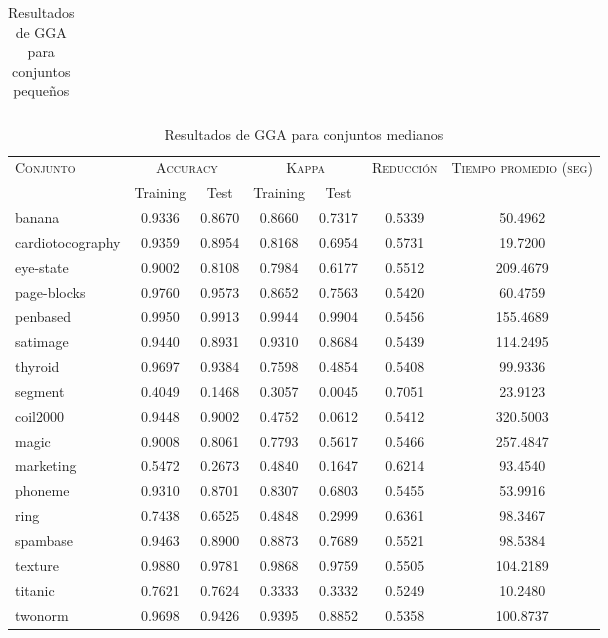 \begin{table}[]
\begin{tabular}{l c c c c c c}
\hline
\end{tabular}
\caption{Resultados de GGA para conjuntos pequeños }
\label{res-peq-gga}
\end{table}


\begin{table}[]
\centering
\begin{tabular}{l c c c c c c}
\hline
\multirow{2}{*}{\textsc{Conjunto}}
	& \multicolumn{2}{c}{\textsc{Accuracy}}
	& \multicolumn{2}{c}{\textsc{Kappa}}
	& \textsc{Reducción}
	& \textsc{Tiempo promedio (seg)} \\
	& Training & Test
	& Training & Test \\ 
\hline
\hline

banana & 0.9336 & 0.8670 & 0.8660 & 0.7317 & 0.5339 & 50.4962 \\
cardiotocography & 0.9359 & 0.8954 & 0.8168 & 0.6954 & 0.5731 & 19.7200 \\
eye-state & 0.9002 & 0.8108 & 0.7984 & 0.6177 & 0.5512 & 209.4679 \\
page-blocks & 0.9760 & 0.9573 & 0.8652 & 0.7563 & 0.5420 & 60.4759 \\
penbased & 0.9950 & 0.9913 & 0.9944 & 0.9904 & 0.5456 & 155.4689 \\
satimage & 0.9440 & 0.8931 & 0.9310 & 0.8684 & 0.5439 & 114.2495 \\
thyroid & 0.9697 & 0.9384 & 0.7598 & 0.4854 & 0.5408 & 99.9336 \\
segment & 0.4049 & 0.1468 & 0.3057 & 0.0045 & 0.7051 & 23.9123 \\
coil2000 & 0.9448 & 0.9002 & 0.4752 & 0.0612 & 0.5412 & 320.5003 \\
magic & 0.9008 & 0.8061 & 0.7793 & 0.5617 & 0.5466 & 257.4847 \\
marketing & 0.5472 & 0.2673 & 0.4840 & 0.1647 & 0.6214 & 93.4540 \\
phoneme & 0.9310 & 0.8701 & 0.8307 & 0.6803 & 0.5455 & 53.9916 \\
ring & 0.7438 & 0.6525 & 0.4848 & 0.2999 & 0.6361 & 98.3467 \\
spambase & 0.9463 & 0.8900 & 0.8873 & 0.7689 & 0.5521 & 98.5384 \\
texture & 0.9880 & 0.9781 & 0.9868 & 0.9759 & 0.5505 & 104.2189 \\
titanic & 0.7621 & 0.7624 & 0.3333 & 0.3332 & 0.5249 & 10.2480 \\
twonorm & 0.9698 & 0.9426 & 0.9395 & 0.8852 & 0.5358 & 100.8737 \\

\hline
\end{tabular}
\caption{Resultados de GGA para conjuntos medianos }
\label{res-med-gga}
\end{table}



